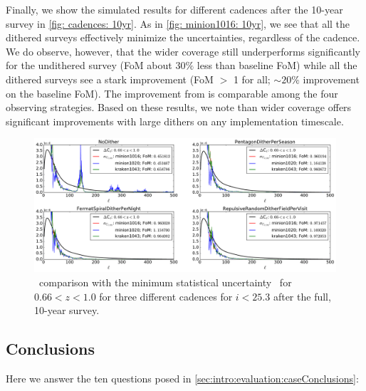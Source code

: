 Finally, we show the simulated results for different cadences after the 10-year survey in \autoref{fig: cadences: 10yr}. As in \autoref{fig: minion1016: 10yr}, we see that all the dithered surveys effectively minimize the uncertainties, regardless of the cadence. We do observe, however, that the wider coverage  still underperforms significantly for the undithered survey (FoM about 30$\%$ less than baseline FoM)  while all the dithered surveys see a stark improvement (FoM $>$ 1 for all; $\sim 20\%$ improvement on the baseline FoM). The improvement from  is comparable among the four observing strategies. Based on these results, we note than wider coverage offers significant improvements with large dithers on any implementation timescale.

\begin{figure}[!htb]
      \centering\includegraphics[width=\linewidth]{figs/awan_10yr_goldSample_3cadences.pdf}
       \vspace*{-2em}
\caption{\sigmaOS\ comparison with the minimum statistical uncertainty \statFloor\ for $0.66<z<1.0$ for three different cadences for $i<25.3$ after the full, 10-year survey.}
\label{fig: cadences: 10yr}
\end{figure}

\subsection{Conclusions}

Here we answer the ten questions posed in
\autoref{sec:intro:evaluation:caseConclusions}:

